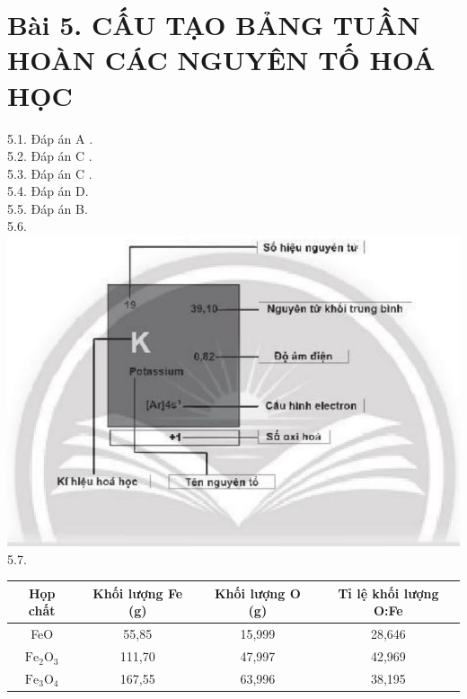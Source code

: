 \documentclass[10pt]{article}
\begin{document}
\section*{Bài 5. CẤU TẠO BẢNG TUẦN HOÀN CÁC NGUYÊN TỐ HOÁ HỌC}
5.1. Đáp án A .\\
5.2. Đáp án C .\\
5.3. Đáp án C .\\
5.4. Đáp án D.\\
5.5. Đáp án B.\\
5.6.\\
\includegraphics[max width=\textwidth, center]{2025_10_23_57761e23b8c46a11c3efg-11}\\
5.7.

\begin{center}
\begin{tabular}{|c|c|c|c|}
\hline
Họp chất & Khối lượng Fe (g) & Khối lượng O (g) & Tỉ lệ khối lượng O:Fe \\
\hline
FeO & 55,85 & 15,999 & 28,646 \\
\hline
$\mathrm{Fe}_{2} \mathrm{O}_{3}$ & 111,70 & 47,997 & 42,969 \\
\hline
$\mathrm{Fe}_{3} \mathrm{O}_{4}$ & 167,55 & 63,996 & 38,195 \\
\hline
\end{tabular}
\end{center}
\end{document}
